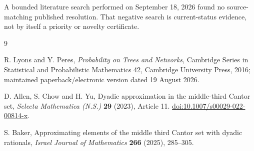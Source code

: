 \documentclass[11pt]{article}
\theoremstyle{remark}
\begin{document}
A bounded literature search performed on September 18, 2026 found no source-matching published resolution.  That negative search is current-status evidence, not by itself a priority or novelty certificate.

\begin{thebibliography}{9}

R. Lyons and Y. Peres,
\emph{Probability on Trees and Networks},
Cambridge Series in Statistical and Probabilistic Mathematics 42,
Cambridge University Press, 2016; maintained paperback/electronic version dated 19 August 2026.

D. Allen, S. Chow and H. Yu,
Dyadic approximation in the middle-third Cantor set,
\emph{Selecta Mathematica (N.S.)} \textbf{29} (2023), Article 11.
\href{https://doi.org/10.1007/s00029-022-00814-x}{doi:10.1007/s00029-022-00814-x}.

S. Baker,
Approximating elements of the middle third Cantor set with dyadic rationals,
\emph{Israel Journal of Mathematics} \textbf{266} (2025), 285--305.

\end{thebibliography}
\end{document}
